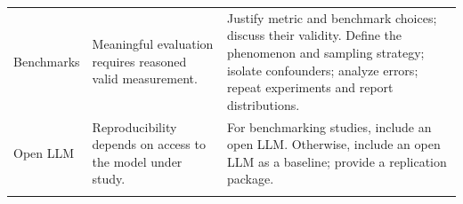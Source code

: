 \documentclass[smallextended]{svjour3}
\newcommand{\must}{\textbf{must}\xspace}
\newcommand{\should}{\textbf{should}\xspace}
\newcommand{\paper}{\emph{paper}\xspace}
\newcommand{\paper}{\emph{paper}\xspace}
\newcommand{\iconM}{\usebox{\iconMbox}\xspace}
\newcommand{\iconS}{\usebox{\iconSbox}\xspace}
\newcommand{\iconM}{●\xspace}
\newcommand{\iconS}{○\xspace}
\begin{document}
\begin{appendices}
\begin{center}
\begin{tabularx}{\textwidth}{@{}l>{\raggedright\arraybackslash}X>{\raggedright\arraybackslash}X@{}}
\addlinespace
Benchmarks & Meaningful evaluation requires reasoned valid measurement. &
\iconM Justify metric and benchmark choices; discuss their validity.
\newline \iconS Define the phenomenon and sampling strategy; isolate confounders; analyze errors; repeat experiments and report distributions. \\
\addlinespace
Open LLM & Reproducibility depends on access to the model under study. &
\iconM For benchmarking studies, include an open LLM.
\newline \iconS Otherwise, include an open LLM as a baseline; provide a replication package. \\
\addlinespace

\end{tabularx}
\end{center}
\end{appendices}
\end{document}
